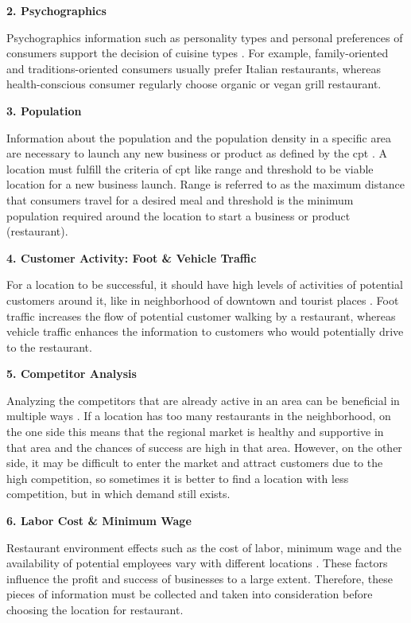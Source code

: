 \documentclass[a4paper, 11pt, oneside]{Thesis}  %
\begin{document}
\textbf{2.	Psychographics}

Psychographics information such as personality types and personal preferences of consumers support the decision of cuisine types \cite{EvanTarver.21.04.2017}. For example, family-oriented and traditions-oriented consumers usually prefer Italian restaurants, whereas health-conscious consumer regularly choose organic or vegan grill restaurant. 

\textbf{3.	Population}

Information about the population and the population density in a specific area are necessary to launch any new business or product as defined by the \ac{cpt} \cite{Chen.2016}. A location must fulfill the criteria of \ac{cpt} like range and threshold to be viable location for a new business launch. Range is referred to as the maximum distance that consumers travel for a desired meal and threshold is the minimum population required around the location to start a business or product (restaurant).

\textbf{4.	Customer Activity: Foot \& Vehicle Traffic}

For a location to be successful, it should have high levels of activities of potential customers around it, like in neighborhood of downtown and tourist places \cite{EvanTarver.21.04.2017}. Foot traffic increases the flow of potential customer walking by a restaurant, whereas vehicle traffic enhances the information to customers who would potentially drive to the restaurant.


\textbf{5.	Competitor Analysis}

Analyzing the competitors that are already active in an area can be beneficial in multiple ways \cite{EvanTarver.21.04.2017}. If a location has too many restaurants in the neighborhood, on the one side this means that the regional market is healthy and supportive in that area and the chances of success are high in that area. However, on the other side, it may be difficult to enter the market and attract customers due to the high competition, so sometimes it is better to find a location with less competition, but in which demand still exists. 

\textbf{6.	Labor Cost \& Minimum Wage}

Restaurant environment effects such as the cost of labor, minimum wage and the availability of potential employees vary with different locations \cite{Webstaurantstore.com.25.07.2018}. These factors influence the profit and success of businesses to a large extent. Therefore, these pieces of information must be collected and taken into consideration before choosing the location for restaurant.
\end{document}
